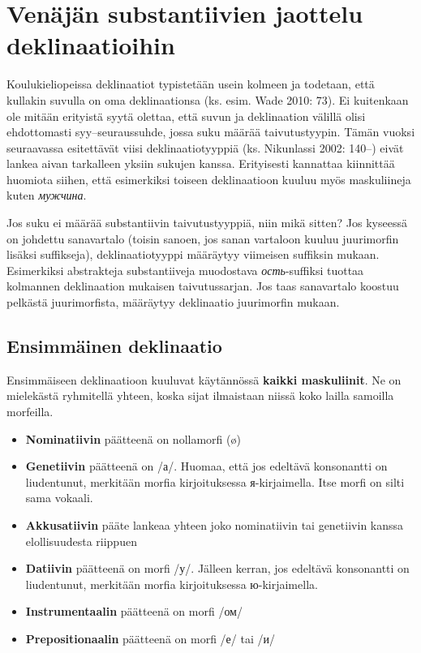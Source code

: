 \documentclass[]{scrreprt}
\providecommand{\tightlist}{%
  \setlength{\itemsep}{0pt}\setlength{\parskip}{0pt}}
\begin{document}
\section{Venäjän substantiivien jaottelu
deklinaatioihin}\label{venuxe4juxe4n-substantiivien-jaottelu-deklinaatioihin}

Koulukieliopeissa deklinaatiot typistetään usein kolmeen ja todetaan,
että kullakin suvulla on oma deklinaationsa (ks. esim. Wade 2010: 73).
Ei kuitenkaan ole mitään erityistä syytä olettaa, että suvun ja
deklinaation välillä olisi ehdottomasti syy--seuraussuhde, jossa suku
määrää taivutustyypin. Tämän vuoksi seuraavassa esitettävät viisi
deklinaatiotyyppiä (ks. Nikunlassi 2002: 140--) eivät lankea aivan
tarkalleen yksiin sukujen kanssa. Erityisesti kannattaa kiinnittää
huomiota siihen, että esimerkiksi toiseen deklinaatioon kuuluu myös
maskuliineja kuten \emph{мужчина}.

Jos suku ei määrää substantiivin taivutustyyppiä, niin mikä sitten? Jos
kyseessä on johdettu sanavartalo (toisin sanoen, jos sanan vartaloon
kuuluu juurimorfin lisäksi suffikseja), deklinaatiotyyppi määräytyy
viimeisen suffiksin mukaan. Esimerkiksi abstrakteja substantiiveja
muodostava \emph{ость}-suffiksi tuottaa kolmannen deklinaation mukaisen
taivutussarjan. Jos taas sanavartalo koostuu pelkästä juurimorfista,
määräytyy deklinaatio juurimorfin mukaan.

\subsection{Ensimmäinen
deklinaatio}\label{ensimmuxe4inen-deklinaatio}

Ensimmäiseen deklinaatioon kuuluvat käytännössä \textbf{kaikki
maskuliinit}. Ne on mielekästä ryhmitellä yhteen, koska sijat ilmaistaan
niissä koko lailla samoilla morfeilla.

\begin{itemize}
\tightlist
\item
  \textbf{Nominatiivin} päätteenä on nollamorfi (ø)
\item
  \textbf{Genetiivin} päätteenä on /а/. Huomaa, että jos edeltävä
  konsonantti on liudentunut, merkitään morfia kirjoituksessa
  я-kirjaimella. Itse morfi on silti sama vokaali.
\item
  \textbf{Akkusatiivin} pääte lankeaa yhteen joko nominatiivin tai
  genetiivin kanssa elollisuudesta riippuen
\item
  \textbf{Datiivin} päätteenä on morfi /у/. Jälleen kerran, jos edeltävä
  konsonantti on liudentunut, merkitään morfia kirjoituksessa
  ю-kirjaimella.
\item
  \textbf{Instrumentaalin} päätteenä on morfi /ом/
\item
  \textbf{Prepositionaalin} päätteenä on morfi /е/ tai /и/
\end{itemize}
\end{document}
